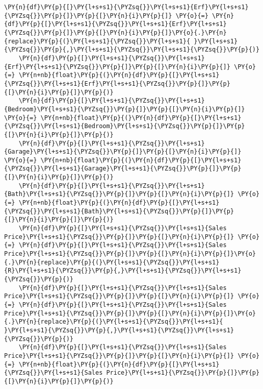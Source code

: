 \begin{tcolorbox}[breakable, size=fbox, boxrule=1pt, pad at break*=1mm,colback=cellbackground, colframe=cellborder]
\begin{Verbatim}[commandchars=\\\{\}]
    \PY{n}{df}\PY{p}{[}\PY{l+s+s1}{\PYZsq{}}\PY{l+s+s1}{Erf}\PY{l+s+s1}{\PYZsq{}}\PY{p}{]}\PY{p}{[}\PY{n}{i}\PY{p}{]} \PY{o}{=} \PY{n}{df}\PY{p}{[}\PY{l+s+s1}{\PYZsq{}}\PY{l+s+s1}{Erf}\PY{l+s+s1}{\PYZsq{}}\PY{p}{]}\PY{p}{[}\PY{n}{i}\PY{p}{]}\PY{o}{.}\PY{n}{replace}\PY{p}{(}\PY{l+s+s1}{\PYZsq{}}\PY{l+s+s1}{ }\PY{l+s+s1}{\PYZsq{}}\PY{p}{,}\PY{l+s+s1}{\PYZsq{}}\PY{l+s+s1}{\PYZsq{}}\PY{p}{)}
    \PY{n}{df}\PY{p}{[}\PY{l+s+s1}{\PYZsq{}}\PY{l+s+s1}{Erf}\PY{l+s+s1}{\PYZsq{}}\PY{p}{]}\PY{p}{[}\PY{n}{i}\PY{p}{]} \PY{o}{=} \PY{n+nb}{float}\PY{p}{(}\PY{n}{df}\PY{p}{[}\PY{l+s+s1}{\PYZsq{}}\PY{l+s+s1}{Erf}\PY{l+s+s1}{\PYZsq{}}\PY{p}{]}\PY{p}{[}\PY{n}{i}\PY{p}{]}\PY{p}{)}
    \PY{n}{df}\PY{p}{[}\PY{l+s+s1}{\PYZsq{}}\PY{l+s+s1}{Bedroom}\PY{l+s+s1}{\PYZsq{}}\PY{p}{]}\PY{p}{[}\PY{n}{i}\PY{p}{]} \PY{o}{=} \PY{n+nb}{float}\PY{p}{(}\PY{n}{df}\PY{p}{[}\PY{l+s+s1}{\PYZsq{}}\PY{l+s+s1}{Bedroom}\PY{l+s+s1}{\PYZsq{}}\PY{p}{]}\PY{p}{[}\PY{n}{i}\PY{p}{]}\PY{p}{)}
    \PY{n}{df}\PY{p}{[}\PY{l+s+s1}{\PYZsq{}}\PY{l+s+s1}{Garage}\PY{l+s+s1}{\PYZsq{}}\PY{p}{]}\PY{p}{[}\PY{n}{i}\PY{p}{]} \PY{o}{=} \PY{n+nb}{float}\PY{p}{(}\PY{n}{df}\PY{p}{[}\PY{l+s+s1}{\PYZsq{}}\PY{l+s+s1}{Garage}\PY{l+s+s1}{\PYZsq{}}\PY{p}{]}\PY{p}{[}\PY{n}{i}\PY{p}{]}\PY{p}{)}
    \PY{n}{df}\PY{p}{[}\PY{l+s+s1}{\PYZsq{}}\PY{l+s+s1}{Bath}\PY{l+s+s1}{\PYZsq{}}\PY{p}{]}\PY{p}{[}\PY{n}{i}\PY{p}{]} \PY{o}{=} \PY{n+nb}{float}\PY{p}{(}\PY{n}{df}\PY{p}{[}\PY{l+s+s1}{\PYZsq{}}\PY{l+s+s1}{Bath}\PY{l+s+s1}{\PYZsq{}}\PY{p}{]}\PY{p}{[}\PY{n}{i}\PY{p}{]}\PY{p}{)}
    \PY{n}{df}\PY{p}{[}\PY{l+s+s1}{\PYZsq{}}\PY{l+s+s1}{Sales Price}\PY{l+s+s1}{\PYZsq{}}\PY{p}{]}\PY{p}{[}\PY{n}{i}\PY{p}{]} \PY{o}{=} \PY{n}{df}\PY{p}{[}\PY{l+s+s1}{\PYZsq{}}\PY{l+s+s1}{Sales Price}\PY{l+s+s1}{\PYZsq{}}\PY{p}{]}\PY{p}{[}\PY{n}{i}\PY{p}{]}\PY{o}{.}\PY{n}{replace}\PY{p}{(}\PY{l+s+s1}{\PYZsq{}}\PY{l+s+s1}{R}\PY{l+s+s1}{\PYZsq{}}\PY{p}{,}\PY{l+s+s1}{\PYZsq{}}\PY{l+s+s1}{\PYZsq{}}\PY{p}{)}
    \PY{n}{df}\PY{p}{[}\PY{l+s+s1}{\PYZsq{}}\PY{l+s+s1}{Sales Price}\PY{l+s+s1}{\PYZsq{}}\PY{p}{]}\PY{p}{[}\PY{n}{i}\PY{p}{]} \PY{o}{=} \PY{n}{df}\PY{p}{[}\PY{l+s+s1}{\PYZsq{}}\PY{l+s+s1}{Sales Price}\PY{l+s+s1}{\PYZsq{}}\PY{p}{]}\PY{p}{[}\PY{n}{i}\PY{p}{]}\PY{o}{.}\PY{n}{replace}\PY{p}{(}\PY{l+s+s1}{\PYZsq{}}\PY{l+s+s1}{ }\PY{l+s+s1}{\PYZsq{}}\PY{p}{,}\PY{l+s+s1}{\PYZsq{}}\PY{l+s+s1}{\PYZsq{}}\PY{p}{)}
    \PY{n}{df}\PY{p}{[}\PY{l+s+s1}{\PYZsq{}}\PY{l+s+s1}{Sales Price}\PY{l+s+s1}{\PYZsq{}}\PY{p}{]}\PY{p}{[}\PY{n}{i}\PY{p}{]} \PY{o}{=} \PY{n+nb}{float}\PY{p}{(}\PY{n}{df}\PY{p}{[}\PY{l+s+s1}{\PYZsq{}}\PY{l+s+s1}{Sales Price}\PY{l+s+s1}{\PYZsq{}}\PY{p}{]}\PY{p}{[}\PY{n}{i}\PY{p}{]}\PY{p}{)}

\end{Verbatim}
\end{tcolorbox}
